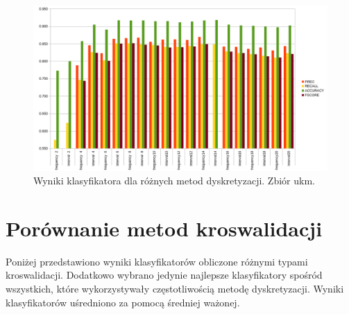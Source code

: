 \begin{figure}[H]
	\centering
		\includegraphics[width=1.0\linewidth]{disc_ukm.png}
	\caption[Wyniki klasyfikatora dla różnych metod dyskretyzacji. Zbiór ukm.]{Wyniki klasyfikatora dla różnych metod dyskretyzacji. Zbiór ukm.}
	\label{fig:disc_ukm}
\end{figure}

\section{Porównanie metod kroswalidacji}
Poniżej przedstawiono wyniki klasyfikatorów obliczone różnymi typami kroswalidacji. Dodatkowo wybrano jedynie najlepsze klasyfikatory spośród wszystkich, które wykorzystywały częstotliwością metodę dyskretyzacji. Wyniki klasyfikatorów uśredniono za pomocą średniej ważonej.

